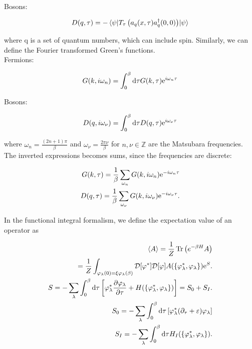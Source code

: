 Bosons: 

\begin{equation*}
    D(q, \tau) = -\mel{\psi}{T_\tau \left(a_q(x,\tau)a_q^{\dagger}(0,0)\right)}{\psi}
\end{equation*}

where q is a set of quantum numbers, which can include spin. Similarly, we can define the Fourier transformed Green's functions. \\ 

Fermions: 

\begin{equation*}
    G(k, i\omega_n) = \int_{0}^{\beta} \dd \tau G(k, \tau) \mathrm{e}^{i\omega_n \tau}
\end{equation*}

Bosons: 

\begin{equation*}
    D(q, i\omega_\nu) = \int_{0}^{\beta} \dd \tau D(q, \tau) \mathrm{e}^{i\omega_\nu\tau}
\end{equation*}

where $\omega_n = \frac{(2n+1)\pi}{\beta}$ and $\omega_\nu = \frac{2\pi \nu}{\beta}$ for $n, \nu \in \mathbb{Z}$ are the Matsubara frequencies. The inverted expressions becomes sums, since the frequencies are discrete: 

\begin{align*}
    G(k, \tau) = \frac{1}{\beta}\sum_{\omega_n}G(k, i\omega_n)\mathrm{e}^{-i\omega_n \tau} \\ 
    D(q,\tau) = \frac{1}{\beta}\sum_{\omega_\nu}G(k, i\omega_\nu)\mathrm{e}^{-i\omega_\nu \tau}. 
\end{align*}

In the functional integral formalism, we define the expectation value of an operator as


    
\begin{align*}
    \expval{A} = \frac{1}{Z} \Tr \left( e^{-\beta H} A \right) \\
    = \frac{1}{Z}\int_{\varphi_\lambda(0) = \xi \varphi_\lambda(\beta)} \mathcal{D} [\varphi^*] \mathcal{D}[\varphi]A(\{\varphi_\lambda^*, \varphi_\lambda\})\mathrm{e}^S. \\ 
    S = - \sum_\lambda \int_{0}^{\beta} \dd \tau \left[ \varphi_\lambda ^* \pdv{\varphi_\lambda}{\tau} + H(\{\varphi_\lambda^*, \varphi_\lambda\})\right] = S_0 + S_I. \\
    S_0 = - \sum_\lambda \int_{0}^{\beta} \dd \tau \left[ \varphi_\lambda ^* ( \partial_\tau + \varepsilon) \varphi_\lambda\right] \\ 
    S_I = - \sum_\lambda \int_{0}^{\beta} \dd \tau H_I(\{\varphi_\lambda^*, \varphi_\lambda\}).
\end{align*}

